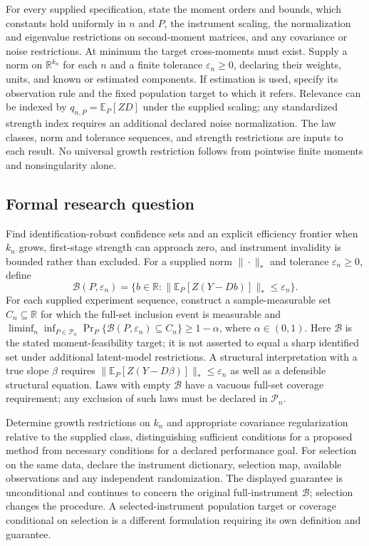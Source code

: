 \documentclass[11pt,a4paper]{article}
\begin{document}
For every supplied specification, state the moment orders and bounds, which constants hold uniformly in $n$ and $P$, the instrument scaling, the normalization and eigenvalue restrictions on second-moment matrices, and any covariance or noise restrictions. At minimum the target cross-moments must exist. Supply a norm on $\mathbb R^{k_n}$ for each $n$ and a finite tolerance $\varepsilon_n\geq0$, declaring their weights, units, and known or estimated components. If estimation is used, specify its observation rule and the fixed population target to which it refers. Relevance can be indexed by $q_{n,P}=\mathbb E_P[ZD]$ under the supplied scaling; any standardized strength index requires an additional declared noise normalization. The law classes, norm and tolerance sequences, and strength restrictions are inputs to each result. No universal growth restriction follows from pointwise finite moments and nonsingularity alone.

\subsection*{Formal research question}

Find identification-robust confidence sets and an explicit efficiency frontier when $k_n$ grows, first-stage strength can approach zero, and instrument invalidity is bounded rather than excluded. For a supplied norm $\|\cdot\|_*$ and tolerance $\varepsilon_n\ge0$, define
\[
\mathcal B(P,\varepsilon_n)=
\{b\in\mathbb R:\|\mathbb E_P[Z(Y-Db)]\|_*\le\varepsilon_n\}.
\]
For each supplied experiment sequence, construct a sample-measurable set $C_n\subseteq\mathbb R$ for which the full-set inclusion event is measurable and
$\liminf_n\inf_{P\in\mathcal P_n}\Pr_P\{\mathcal B(P,\varepsilon_n)\subseteq C_n\}\ge1-\alpha$, where $\alpha\in(0,1)$. Here $\mathcal B$ is the stated moment-feasibility target; it is not asserted to equal a sharp identified set under additional latent-model restrictions. A structural interpretation with a true slope $\beta$ requires $\|\mathbb E_P[Z(Y-D\beta)]\|_*\leq\varepsilon_n$ as well as a defensible structural equation. Laws with empty $\mathcal B$ have a vacuous full-set coverage requirement; any exclusion of such laws must be declared in $\mathcal P_n$.

Determine growth restrictions on $k_n$ and appropriate covariance regularization relative to the supplied class, distinguishing sufficient conditions for a proposed method from necessary conditions for a declared performance goal. For selection on the same data, declare the instrument dictionary, selection map, available observations and any independent randomization. The displayed guarantee is unconditional and continues to concern the original full-instrument $\mathcal B$; selection changes the procedure. A selected-instrument population target or coverage conditional on selection is a different formulation requiring its own definition and guarantee.
\end{document}
